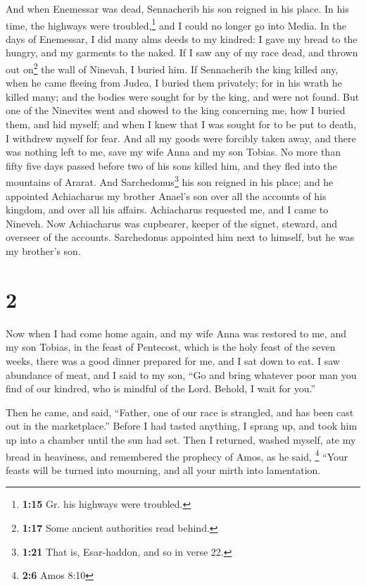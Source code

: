  And when Enemessar was dead, Sennacherib his son reigned
in his place. In his time, the highways were troubled,\footnote{\textbf{1:15}
  Gr. his highways were troubled.} and I could no longer go into Media.
 In the days of Enemessar, I did many alms deeds to my
kindred: I gave my bread to the hungry,  and my garments
to the naked. If I saw any of my race dead, and thrown out on\footnote{\textbf{1:17}
  Some ancient authorities read behind.} the wall of Ninevah, I buried
him.  If Sennacherib the king killed any, when he came
fleeing from Judea, I buried them privately; for in his wrath he killed
many; and the bodies were sought for by the king, and were not found.
 But one of the Ninevites went and showed to the king
concerning me, how I buried them, and hid myself; and when I knew that I
was sought for to be put to death, I withdrew myself for fear.
 And all my goods were forcibly taken away, and there was
nothing left to me, save my wife Anna and my son Tobias. 
No more than fifty five days passed before two of his sons killed him,
and they fled into the mountains of Ararat. And Sarchedonus\footnote{\textbf{1:21}
  That is, Esar-haddon, and so in verse 22.} his son reigned in his
place; and he appointed Achiacharus my brother Anael's son over all the
accounts of his kingdom, and over all his affairs. 
Achiacharus requested me, and I came to Nineveh. Now Achiacharus was
cupbearer, keeper of the signet, steward, and overseer of the accounts.
Sarchedonus appointed him next to himself, but he was my brother's son.

\hypertarget{section-1}{%
\section{2}\label{section-1}}

 Now when I had come home again, and my wife Anna was
restored to me, and my son Tobias, in the feast of Pentecost, which is
the holy feast of the seven weeks, there was a good dinner prepared for
me, and I sat down to eat.  I saw abundance of meat, and I
said to my son, ``Go and bring whatever poor man you find of our
kindred, who is mindful of the Lord. Behold, I wait for you.''

 Then he came, and said, ``Father, one of our race is
strangled, and has been cast out in the marketplace.'' 
Before I had tasted anything, I sprang up, and took him up into a
chamber until the sun had set.  Then I returned, washed
myself, ate my bread in heaviness,  and remembered the
prophecy of Amos, as he said, \footnote{\textbf{2:6} Amos 8:10} ``Your
feasts will be turned into mourning, and all your mirth into
lamentation.


